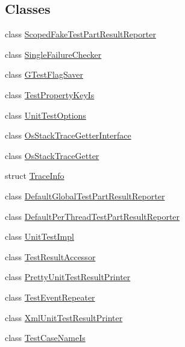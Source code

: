 \subsection*{\-Classes}
\begin{DoxyCompactItemize}
\item 
class \hyperlink{classtesting_1_1ScopedFakeTestPartResultReporter}{\-Scoped\-Fake\-Test\-Part\-Result\-Reporter}
\item 
class \hyperlink{classtesting_1_1internal_1_1SingleFailureChecker}{\-Single\-Failure\-Checker}
\item 
class \hyperlink{classtesting_1_1internal_1_1GTestFlagSaver}{\-G\-Test\-Flag\-Saver}
\item 
class \hyperlink{classtesting_1_1internal_1_1TestPropertyKeyIs}{\-Test\-Property\-Key\-Is}
\item 
class \hyperlink{classtesting_1_1internal_1_1UnitTestOptions}{\-Unit\-Test\-Options}
\item 
class \hyperlink{classtesting_1_1internal_1_1OsStackTraceGetterInterface}{\-Os\-Stack\-Trace\-Getter\-Interface}
\item 
class \hyperlink{classtesting_1_1internal_1_1OsStackTraceGetter}{\-Os\-Stack\-Trace\-Getter}
\item 
struct \hyperlink{structtesting_1_1internal_1_1TraceInfo}{\-Trace\-Info}
\item 
class \hyperlink{classtesting_1_1internal_1_1DefaultGlobalTestPartResultReporter}{\-Default\-Global\-Test\-Part\-Result\-Reporter}
\item 
class \hyperlink{classtesting_1_1internal_1_1DefaultPerThreadTestPartResultReporter}{\-Default\-Per\-Thread\-Test\-Part\-Result\-Reporter}
\item 
class \hyperlink{classtesting_1_1internal_1_1UnitTestImpl}{\-Unit\-Test\-Impl}
\item 
class \hyperlink{classtesting_1_1internal_1_1TestResultAccessor}{\-Test\-Result\-Accessor}
\item 
class \hyperlink{classtesting_1_1internal_1_1PrettyUnitTestResultPrinter}{\-Pretty\-Unit\-Test\-Result\-Printer}
\item 
class \hyperlink{classtesting_1_1internal_1_1TestEventRepeater}{\-Test\-Event\-Repeater}
\item 
class \hyperlink{classtesting_1_1internal_1_1XmlUnitTestResultPrinter}{\-Xml\-Unit\-Test\-Result\-Printer}
\item 
class \hyperlink{classtesting_1_1internal_1_1TestCaseNameIs}{\-Test\-Case\-Name\-Is}
\end{DoxyCompactItemize}

